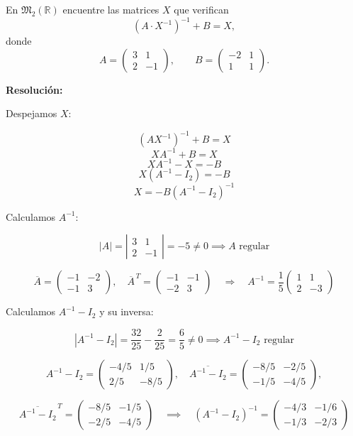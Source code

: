 \documentclass[a4paper,12pt]{article}
\begin{document}
\begin{ejercicio}[title=Ejercicio 21]
En $\mathfrak{M}_2(\mathbb{R})$ encuentre las matrices $X$ que verifican
\[
(A \cdot X^{-1})^{-1} + B = X,
\]
donde
\[
A =
\begin{pmatrix}
3 & 1\\
2 & -1
\end{pmatrix}, \qquad
B =
\begin{pmatrix}
-2 & 1\\
1 & 1
\end{pmatrix}.
\]

\tcblower
\textbf{Resolución:}

Despejamos $X$:

\[
(A X^{-1})^{-1} + B = X
\]
\[
X A^{-1} + B = X
\]
\[
X A^{-1} - X = -B
\]
\[
X (A^{-1} - I_2) = -B
\]
\[
X = -B (A^{-1} - I_2)^{-1}
\]

Calculamos $A^{-1}$:

\[
|A| = \left|\begin{matrix}
    3 & 1 \\ 2 & -1
\end{matrix}\right| = -5 \ne 0 
\implies
A
\text{ regular}
\]

\[
\overline{A} = 
\begin{pmatrix}
-1 & -2\\
-1 & 3
\end{pmatrix}, \quad
\overline{A}^{\,T} = 
\begin{pmatrix}
-1 & -1\\
-2 & 3
\end{pmatrix} \quad \Rightarrow \quad
A^{-1} = \frac{1}{5} 
\begin{pmatrix}
1 & 1\\
2 & -3
\end{pmatrix}
\]

Calculamos $A^{-1}-I_2$ y su inversa:

\[
|A^{-1} - I_2| = \frac{32}{25} - \frac{2}{25} = \frac{6}{5} \ne 0 \implies
A^{-1} - I_2
\text{ regular}
\]

\[
A^{-1} - I_2 = 
\begin{pmatrix}
-4/5 & 1/5\\
2/5 & -8/5
\end{pmatrix}, \quad
\overline{A^{-1} - I_2} = 
\begin{pmatrix}
-8/5 & -2/5\\
-1/5 & -4/5
\end{pmatrix}, 
\]

\[
\overline{A^{-1} - I_2}^{\,T} = 
\begin{pmatrix}
-8/5 & -1/5\\
-2/5 & -4/5
\end{pmatrix} 
\quad\implies\quad
(A^{-1} - I_2)^{-1} = 
\begin{pmatrix}
-4/3 & -1/6\\
-1/3 & -2/3
\end{pmatrix}
\]


\end{ejercicio}
\end{document}
